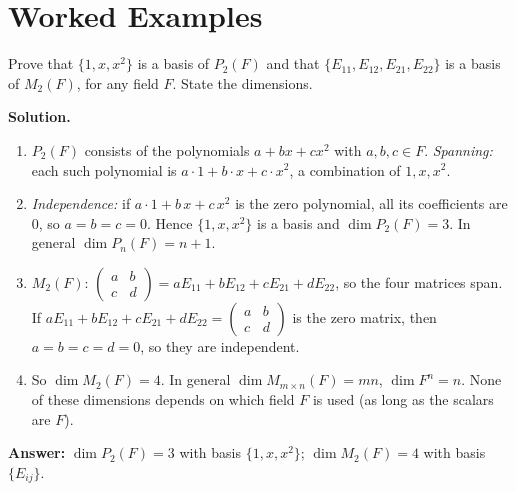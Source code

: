 \documentclass[11pt]{article}
\begin{document}
\section*{\large\color{ink} Worked Examples}
\begin{tcolorbox}[breakable,colback=white,colframe=ink!60,title={\bfseries Example 1 \textperiodcentered\ Standard bases and dimensions}]Prove that $\{1,x,x^{2}\}$ is a basis of $P_2(F)$ and that $\{E_{11},E_{12},E_{21},E_{22}\}$ is a basis of $M_2(F)$, for any field $F$. State the dimensions.
\par\smallskip
\textbf{Solution.} \begin{enumerate}[leftmargin=1.6em,itemsep=1pt,topsep=2pt,label=\arabic*.]\item $P_2(F)$ consists of the polynomials $a+bx+cx^{2}$ with $a,b,c\in F$. \emph{Spanning:} each such polynomial is $a\cdot1+b\cdot x+c\cdot x^{2}$, a combination of $1,x,x^{2}$.
\item \emph{Independence:} if $a\cdot1+b\,x+c\,x^{2}$ is the zero polynomial, all its coefficients are $0$, so $a=b=c=0$. Hence $\{1,x,x^{2}\}$ is a basis and $\dim P_2(F)=3$. In general $\dim P_n(F)=n+1$.
\item $M_2(F)$: $\begin{pmatrix}a&b\\c&d\end{pmatrix}=aE_{11}+bE_{12}+cE_{21}+dE_{22}$, so the four matrices span. If $aE_{11}+bE_{12}+cE_{21}+dE_{22}=\begin{pmatrix}a&b\\c&d\end{pmatrix}$ is the zero matrix, then $a=b=c=d=0$, so they are independent.
\item So $\dim M_2(F)=4$. In general $\dim M_{m\times n}(F)=mn$, $\dim F^{n}=n$. None of these dimensions depends on which field $F$ is used (as long as the scalars are $F$).
\end{enumerate}\textbf{Answer:} $\dim P_2(F)=3$ with basis $\{1,x,x^{2}\}$; $\dim M_2(F)=4$ with basis $\{E_{ij}\}$.
\end{tcolorbox}
\end{document}
